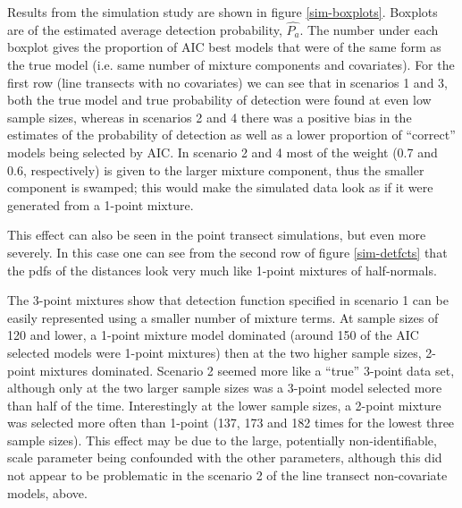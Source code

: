 \documentclass[useAMS,referee, usegraphicx]{biom}
\begin{document}
Results from the simulation study are shown in figure \ref{sim-boxplots}. Boxplots are of the estimated average detection probability, $\hat{P_a}$. The number under each boxplot gives the proportion of AIC best models that were of the same form as the true model (i.e. same number of mixture components and covariates). For the first row (line transects with no covariates) we can see that in scenarios 1 and 3, both the true model and true probability of detection were found at even low sample sizes, whereas in scenarios 2 and 4 there was a positive bias in the estimates of the probability of detection as well as a lower proportion of ``correct'' models being selected by AIC. In scenario 2 and 4 most of the weight (0.7 and 0.6, respectively) is given to the larger mixture component, thus the smaller component is swamped; this would make the simulated data look as if it were generated from a 1-point mixture.

This effect can also be seen in the point transect simulations, but even more severely. In this case one can see from the second row of figure \ref{sim-detfcts} that the pdfs of the distances look very much like 1-point mixtures of half-normals. 

The 3-point mixtures show that detection function specified in scenario 1 can be easily represented using a smaller number of mixture terms. At sample sizes of 120 and lower, a 1-point mixture model dominated (around 150 of the AIC selected models were 1-point mixtures) then at the two higher sample sizes, 2-point mixtures dominated. Scenario 2 seemed more like a ``true'' 3-point data set, although only at the two larger sample sizes was a 3-point model selected more than half of the time. Interestingly at the lower sample sizes, a 2-point mixture was selected more often than 1-point (137, 173 and 182 times for the lowest three sample sizes). This effect may be due to the large, potentially non-identifiable, scale parameter being confounded with the other parameters, although this did not appear to be problematic in the scenario 2 of the line transect non-covariate models, above.
\end{document}
